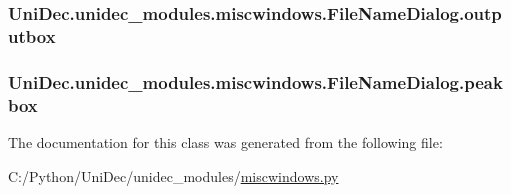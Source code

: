 \subsubsection[{outputbox}]{\setlength{\rightskip}{0pt plus 5cm}Uni\+Dec.\+unidec\+\_\+modules.\+miscwindows.\+File\+Name\+Dialog.\+outputbox}\label{class_uni_dec_1_1unidec__modules_1_1miscwindows_1_1_file_name_dialog_a2466a2a475542540cd0537465e2233e8}
\hypertarget{class_uni_dec_1_1unidec__modules_1_1miscwindows_1_1_file_name_dialog_a3feaf8f79eaa40f20447662228238f9a}{}
\subsubsection[{peakbox}]{\setlength{\rightskip}{0pt plus 5cm}Uni\+Dec.\+unidec\+\_\+modules.\+miscwindows.\+File\+Name\+Dialog.\+peakbox}\label{class_uni_dec_1_1unidec__modules_1_1miscwindows_1_1_file_name_dialog_a3feaf8f79eaa40f20447662228238f9a}


The documentation for this class was generated from the following file\+:\begin{DoxyCompactItemize}
\item 
C\+:/\+Python/\+Uni\+Dec/unidec\+\_\+modules/\hyperlink{miscwindows_8py}{miscwindows.\+py}\end{DoxyCompactItemize}
